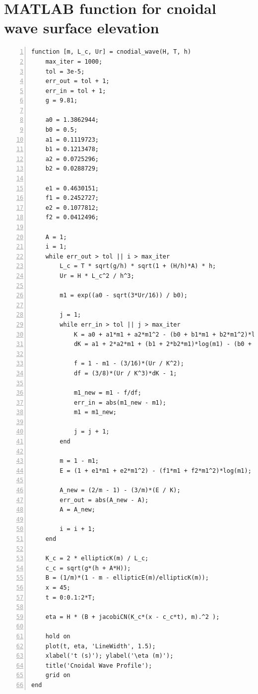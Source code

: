 \documentclass[a4paper]{article}
\begin{document}
\section{\small MATLAB function for cnoidal wave surface elevation}
\begin{lstlisting}[frame=single, numbers=left, style=Matlab-Pyglike]
function [m, L_c, Ur] = cnodial_wave(H, T, h)
    max_iter = 1000;
    tol = 3e-5;
    err_out = tol + 1;
    err_in = tol + 1;
    g = 9.81;

    a0 = 1.3862944;
    b0 = 0.5;
    a1 = 0.1119723;
    b1 = 0.1213478;
    a2 = 0.0725296;
    b2 = 0.0288729;

    e1 = 0.4630151;
    f1 = 0.2452727;
    e2 = 0.1077812;
    f2 = 0.0412496;

    A = 1;
    i = 1;
    while err_out > tol || i > max_iter
        L_c = T * sqrt(g/h) * sqrt(1 + (H/h)*A) * h;
        Ur = H * L_c^2 / h^3;
        
        m1 = exp((a0 - sqrt(3*Ur/16)) / b0);
    
        j = 1;
        while err_in > tol || j > max_iter
            K = a0 + a1*m1 + a2*m1^2 - (b0 + b1*m1 + b2*m1^2)*log(m1);
            dK = a1 + 2*a2*m1 + (b1 + 2*b2*m1)*log(m1) - (b0 + b1*m1 + b2*m1^2)/m1;
            
            f = 1 - m1 - (3/16)*(Ur / K^2);
            df = (3/8)*(Ur / K^3)*dK - 1;
    
            m1_new = m1 - f/df;
            err_in = abs(m1_new - m1);
            m1 = m1_new;
    
            j = j + 1;
        end

        m = 1 - m1;
        E = (1 + e1*m1 + e2*m1^2) - (f1*m1 + f2*m1^2)*log(m1);
        
        A_new = (2/m - 1) - (3/m)*(E / K);
        err_out = abs(A_new - A);
        A = A_new;

        i = i + 1;
    end

    K_c = 2 * ellipticK(m) / L_c;  
    c_c = sqrt(g*(h + A*H));
    B = (1/m)*(1 - m - ellipticE(m)/ellipticK(m));
    x = 45;  
    t = 0:0.1:2*T;  

    eta = H * (B + jacobiCN(K_c*(x - c_c*t), m).^2 );
    
    hold on
    plot(t, eta, 'LineWidth', 1.5);
    xlabel('t (s)'); ylabel('\eta (m)');
    title('Cnoidal Wave Profile');
    grid on
end
\end{lstlisting}
\end{document}
